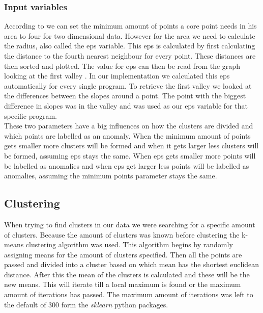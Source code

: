 \subsubsection{Input variables}
According to \cite{ester1996density} we can set the minimum amount of points a core point needs in his area to four for two dimensional data. However for the area we need to calculate the radius, also called the eps variable. This eps is calculated by first calculating the distance to the fourth nearest neighbour for every point. These distances are then sorted and plotted. The value for eps can then be read from the graph looking at the first valley \cite{ester1996density}. In our implementation we calculated this eps automatically for every single program. To retrieve the first valley we looked at the differences between the slopes around a point. The point with the biggest difference in slopes was in the valley and was used as our eps variable for that specific program.\\

These two parameters have a big influences on how the clusters are divided and which points are labelled as an anomaly. When the minimum amount of points gets smaller more clusters will be formed and when it gets larger less clusters will be formed, assuming eps stays the same. When eps gets smaller more points will be labelled as anomalies and when eps get larger less points will be labelled as anomalies, assuming the minimum points parameter stays the same.

\subsection{Clustering}
When trying to find clusters in our data we were searching for a specific amount of clusters. Because the amount of clusters was known before clustering the k-means clustering algorithm was used. This algorithm begins by randomly assigning means for the amount of clusters specified. Then all the points are passed and divided into a cluster based on which mean has the shortest euclidean distance. After this the mean of the clusters is calculated and these will be the new means. This will iterate till a local maximum is found or the maximum amount of iterations has passed. The maximum amount of iterations was left to the default of 300 form the \textit{sklearn} python packages.


